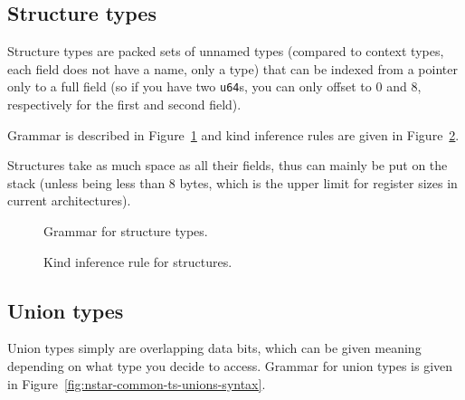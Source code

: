 \subsection{Structure types}\label{subsec:nstar-common-ts-structs}

Structure types are packed sets of unnamed types (compared to context types, each field does not have a name, only a type) that can be indexed from a pointer only to a full field (so if you have two \texttt{u64}s, you can only offset to $0$ and $8$, respectively for the first and second field).

Grammar is described in Figure~\ref{fig:nstar-common-ts-structs-syntax} and kind inference rules are given in Figure~\ref{fig:nstar-common-ts-structs-kindrules}.

Structures take as much space as all their fields, thus can mainly be put on the stack (unless being less than 8 bytes, which is the upper limit for register sizes in current architectures).

\begin{figure}[htb]
  \centering


  \caption{Grammar for structure types.}
  \label{fig:nstar-common-ts-structs-syntax}
\end{figure}

\begin{figure}[H]
  \centering


  \caption{Kind inference rule for structures.}
  \label{fig:nstar-common-ts-structs-kindrules}
\end{figure}

\subsection{Union types}\label{subsec:nstar-common-ts-unions}

Union types simply are overlapping data bits, which can be given meaning depending on what type you decide to access.
Grammar for union types is given in Figure~\ref{fig:nstar-common-ts-unions-syntax}.

